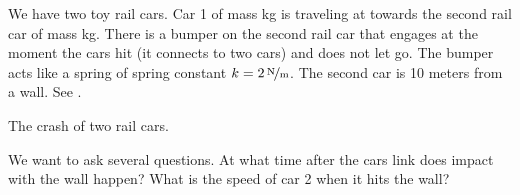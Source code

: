 \documentclass{ximera}
\begin{document}
\begin{example} \label{sosa:railcarexample}
We have two toy rail cars.  Car 1 of mass \unit[2]{kg} is traveling at  towards the second rail car of mass \unit[1]{kg}.  There is a bumper on the second rail car that engages at the moment the cars hit (it connects to two cars) and does not let go. The bumper acts like a spring of spring constant $k=\unitfrac[2]{N}{m}$. The second car is 10 meters from a wall.  See . 

\begin{myfig}
    \capstart
    
    \caption{The crash of two rail cars.\label{sosa:railcarscrashfig}}
\end{myfig}

We want to ask several questions.  At what time after the cars link does impact with the wall happen?  What is the speed of car 2 when it hits the wall?
\end{example}
\end{document}
